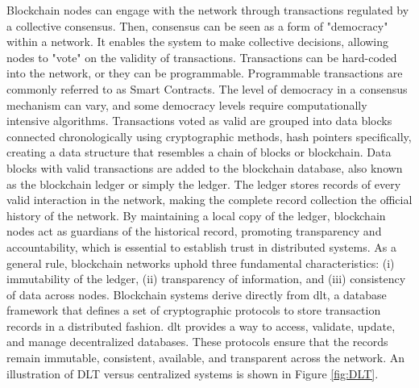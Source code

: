 \documentclass[conference]{IEEEtran}
\begin{document}
Blockchain nodes can engage with the network through transactions regulated by a collective consensus. Then, consensus can be seen as a form of "democracy" within a network. It enables the system to make collective decisions, allowing nodes to "vote" on the validity of transactions. Transactions can be hard-coded into the network, or they can be programmable. Programmable transactions are commonly referred to as Smart Contracts. The level of democracy in a consensus mechanism can vary, and some democracy levels require computationally intensive algorithms. Transactions voted as valid are grouped into data blocks connected chronologically using cryptographic methods, hash pointers specifically, creating a data structure that resembles a chain of blocks or blockchain. Data blocks with valid transactions are added to the blockchain database, also known as the blockchain ledger or simply the ledger. The ledger stores records of every valid interaction in the network, making the complete record collection the official history of the network. By maintaining a local copy of the ledger, blockchain nodes act as guardians of the historical record, promoting transparency and accountability, which is essential to establish trust in distributed systems. As a general rule, blockchain networks uphold three fundamental characteristics: (i) immutability of the ledger, (ii) transparency of information, and (iii) consistency of data across nodes. Blockchain systems derive directly from \ac{dlt}, a database framework that defines a set of cryptographic protocols to store transaction records in a distributed fashion. \ac{dlt} provides a way to access, validate, update, and manage decentralized databases. These protocols ensure that the records remain immutable, consistent, available, and transparent across the network. An illustration of DLT versus centralized systems is shown in Figure \ref{fig:DLT}. 
\end{document}
